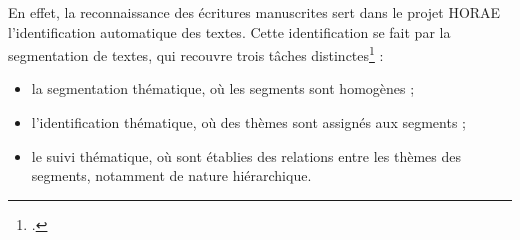 \documentclass[a4paper,12pt,twoside]{book}
\begin{document}

	
	En effet, la reconnaissance des écritures manuscrites sert dans le projet HORAE l'identification automatique des textes. Cette identification se fait par la segmentation de textes, qui recouvre trois tâches distinctes\footcite[p. 26]{Seg_Livres_Heures} : 
	\begin{itemize}
	    \item la segmentation thématique, où les segments sont homogènes ;
	    \item l'identification thématique, où des thèmes sont assignés aux segments ;
	    \item le suivi thématique, où sont établies des relations entre les thèmes des segments, notamment de nature hiérarchique.
	\end{itemize}
	
\end{document}
